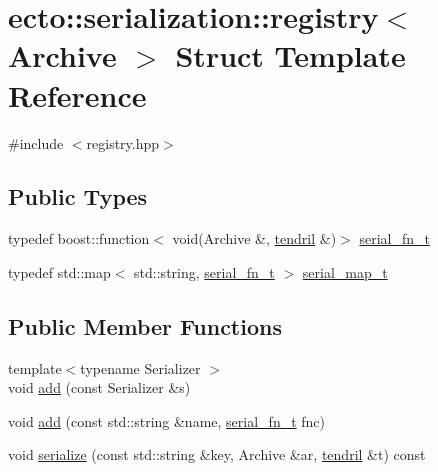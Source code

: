 \hypertarget{structecto_1_1serialization_1_1registry}{\section{ecto\-:\-:serialization\-:\-:registry$<$ \-Archive $>$ \-Struct \-Template \-Reference}
\label{structecto_1_1serialization_1_1registry}
}


{\ttfamily \#include $<$registry.\-hpp$>$}

\subsection*{\-Public \-Types}
\begin{DoxyCompactItemize}
\item 
typedef boost\-::function$<$ void(\-Archive \*
\&, \hyperlink{classecto_1_1tendril}{tendril} \&)$>$ \hyperlink{structecto_1_1serialization_1_1registry_a9bbc5358e0b5bb519983c16db9c6391b}{serial\-\_\-fn\-\_\-t}
\item 
typedef std\-::map$<$ std\-::string, \*
\hyperlink{structecto_1_1serialization_1_1registry_a9bbc5358e0b5bb519983c16db9c6391b}{serial\-\_\-fn\-\_\-t} $>$ \hyperlink{structecto_1_1serialization_1_1registry_a89253dc4749e297b132dacb9e14967c2}{serial\-\_\-map\-\_\-t}
\end{DoxyCompactItemize}
\subsection*{\-Public \-Member \-Functions}
\begin{DoxyCompactItemize}
\item 
{\footnotesize template$<$typename Serializer $>$ }\\void \hyperlink{structecto_1_1serialization_1_1registry_ae82f89f8e2bdcf2573671a6d390a94e2}{add} (const \-Serializer \&s)
\item 
void \hyperlink{structecto_1_1serialization_1_1registry_a9642b0813d8bb6c99dffb527b9d57419}{add} (const std\-::string \&name, \hyperlink{structecto_1_1serialization_1_1registry_a9bbc5358e0b5bb519983c16db9c6391b}{serial\-\_\-fn\-\_\-t} fnc)
\item 
void \hyperlink{structecto_1_1serialization_1_1registry_afaecca49afab42cb3f41a7a515b69cbb}{serialize} (const std\-::string \&key, \-Archive \&ar, \hyperlink{classecto_1_1tendril}{tendril} \&t) const 
\end{DoxyCompactItemize}
